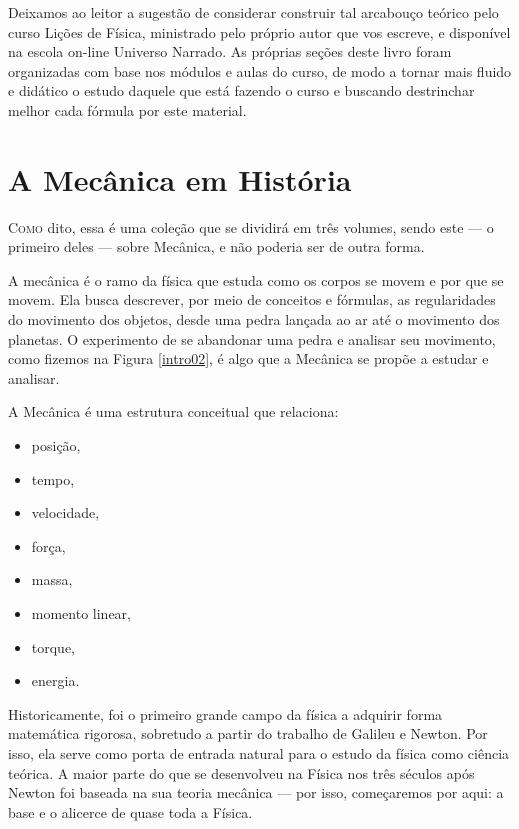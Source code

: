 Deixamos ao leitor a sugestão de considerar construir tal arcabouço teórico pelo curso Lições de Física, ministrado pelo próprio autor que vos escreve, e disponível na escola on-line Universo Narrado. As próprias seções deste livro foram organizadas com base nos módulos e aulas do curso, de modo a tornar mais fluido e didático o estudo daquele que está fazendo o curso e buscando destrinchar melhor cada fórmula por este material. 



\section{A Mecânica em História}

\lettrine{C}{omo} dito, essa é uma coleção que se dividirá em três volumes, sendo este --- o primeiro deles --- sobre Mecânica, e não poderia ser de outra forma.

A mecânica é o ramo da física que estuda como os corpos se movem e por que se movem. Ela busca descrever, por meio de conceitos e fórmulas, as regularidades do movimento dos objetos, desde uma pedra lançada ao ar até o movimento dos planetas. O experimento de se abandonar uma pedra e analisar seu movimento, como fizemos na Figura \ref{intro02}, é algo que a Mecânica se propõe a estudar e analisar.

A Mecânica é uma estrutura conceitual que relaciona:

\begin{itemize}
    \item posição,
     \item tempo,
      \item velocidade,
       \item força,
        \item massa,
         \item momento linear,
          \item torque,
         \item energia.
\end{itemize}


Historicamente, foi o primeiro grande campo da física a adquirir forma matemática rigorosa, sobretudo a partir do trabalho de Galileu e Newton. Por isso, ela serve como porta de entrada natural para o estudo da física como ciência teórica. A maior parte do que se desenvolveu na Física nos três séculos após Newton foi baseada na sua teoria mecânica --- por isso, começaremos por aqui: a base e o alicerce de quase toda a Física.

